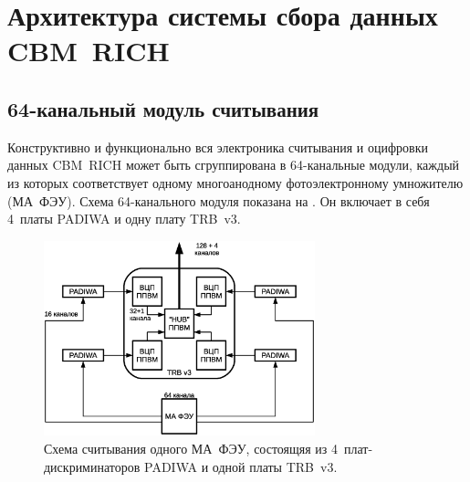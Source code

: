 \section{Архитектура системы сбора данных CBM~RICH}\label{section:secReadout}

\subsection{64-канальный модуль считывания}\label{section:secModule}

Конструктивно и функционально вся электроника считывания и оцифровки данных CBM~RICH может быть сгруппирована в 64-канальные модули, каждый из которых соответствует одному многоанодному фотоэлектронному умножителю (МА~ФЭУ). Схема 64-канального модуля показана на . Он включает в себя 4~платы PADIWA и одну плату TRB~v3.

\begin{figure}[H]
\centering
\includegraphics[width=0.7\textwidth]{pictures/4_A_PMT_readout_rus.eps}
\caption{Схема считывания одного МА~ФЭУ, состоящяя из 4~плат-дискриминаторов PADIWA и одной платы TRB~v3.}
\label{fig:ReadoutModule}
\end{figure}

